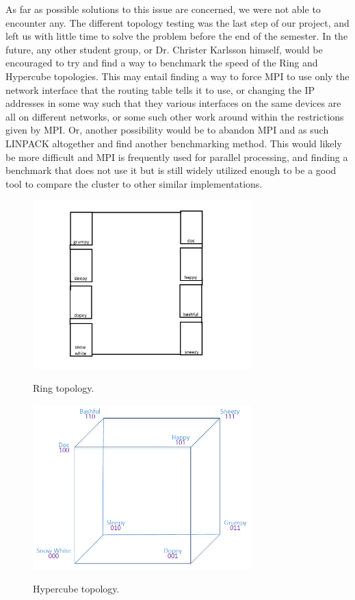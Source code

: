 As far as possible solutions to this issue are concerned, we were not able to encounter any. The different topology testing was the last step of our project, and left us with little time to solve the problem before the end of the semester. In the future, any other student group, or Dr. Christer Karlsson himself, would be encouraged to try and find a way to benchmark the speed of the Ring and Hypercube topologies. This may entail finding a way to force MPI to use only the network interface that the routing table tells it to use, or changing the IP addresses in some way such that they various interfaces on the same devices are all on different networks, or some such other work around within the restrictions given by MPI. Or, another possibility would be to abandon MPI and as such LINPACK altogether and find another benchmarking method. This would likely be more difficult and MPI is frequently used for parallel processing, and finding a benchmark that does not use it but is still widely utilized enough to be a good tool to compare the cluster to other similar implementations. 

\begin{figure}[tbh]
	\caption{Ring topology.}
	\centering
		\includegraphics[width=0.75\textwidth]{ring.png}
	\label{fig:ring}
\end{figure}

\begin{figure}[tbh]
	\caption{Hypercube topology.}
	\centering
		\includegraphics[width=0.75\textwidth]{HyperCube2.png}
	\label{fig:cube}
\end{figure}

